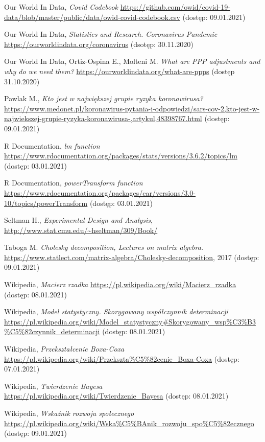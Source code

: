 \documentclass[12pt]{mwbk}
\theoremstyle{plain}
\theoremstyle{definition}
\theoremstyle{definition}
\begin{document}
\begin{thebibliography}{99}
 Our World In Data, \emph{Covid Codebook} \url{https://github.com/owid/covid-19-data/blob/master/public/data/owid-covid-codebook.csv} (dostęp: 09.01.2021)

 Our World In Data, \emph{Statistics and Research. Coronavirus Pandemic} \url{https://ourworldindata.org/coronavirus} (dsotęp: 30.11.2020)

 Our World In Data, Ortiz-Ospina E., Molteni M. \emph{What are PPP adjustments and why do we need them?} \url{https://ourworldindata.org/what-are-ppps} (dostęp 31.10.2020)

 Pawlak M., \emph{Kto jest w największej grupie ryzyka koronawirusa?} \url{https://www.medonet.pl/koronawirus-pytania-i-odpowiedzi/sars-cov-2,kto-jest-w-najwiekszej-grupie-ryzyka-koronawirusa-,artykul,48398767.html} (dostęp: 09.01.2021)

 R Documentation, \emph{lm function} \url{https://www.rdocumentation.org/packages/stats/versions/3.6.2/topics/lm} (dostęp: 03.01.2021)

 R Documentation, \emph{powerTransform function} \url{https://www.rdocumentation.org/packages/car/versions/3.0-10/topics/powerTransform} (dostęp: 03.01.2021)

 Seltman H., \emph{Experimental Design and Analysis}, \url{http://www.stat.cmu.edu/~hseltman/309/Book/}

 Taboga M. \emph{Cholesky decomposition, Lectures on matrix algebra.} \url{https://www.statlect.com/matrix-algebra/Cholesky-decomposition}, 2017 (dostęp: 09.01.2021)

 Wikipedia, \emph{Macierz rzadka} \url{https://pl.wikipedia.org/wiki/Macierz_rzadka} (dostęp: 08.01.2021)

 Wikipedia, \emph{Model statystyczny. Skorygowany współczynnik determinacji} \url{https://pl.wikipedia.org/wiki/Model\_statystyczny#Skorygowany\_wsp\%C3\%B3\%C5\%82czynnik\_determinacji} (dostęp: 08.01.2021)

 Wikipedia, \emph{Przekształcenie Boxa-Coxa} \url{https://pl.wikipedia.org/wiki/Przekszta\%C5\%82cenie\_Boxa-Coxa} (dostęp: 07.01.2021)

 Wikipedia, \emph{Twierdzenie Bayesa} \url{https://pl.wikipedia.org/wiki/Twierdzenie_Bayesa} (dostęp: 08.01.2021)

 Wikipedia, \emph{Wskaźnik rozwoju społecznego} \url{https://pl.wikipedia.org/wiki/Wska\%C5\%BAnik\_rozwoju\_spo\%C5\%82ecznego} (dostęp: 09.01.2021)


\end{thebibliography}
\end{document}
